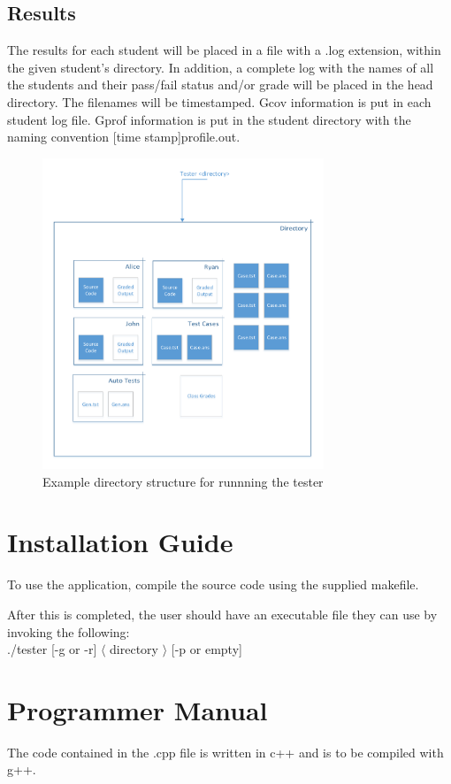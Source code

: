 \subsection{Results}
The results for each student will be placed in a file with a .log extension, within the given student's directory. 
In addition, a complete log with the names of all the students and their pass/fail status and/or grade will be placed 
in the head directory. The filenames will be timestamped. Gcov information is put in each student log file. Gprof information is put in the student directory with the naming convention [time stamp]profile.out.

\begin{figure}[H]
\begin{center}
\includegraphics[width=0.75\textwidth]{./Dir_struct}
\end{center}
\caption{Example directory structure for runnning the tester \label{dir}}
\end{figure}

\section{Installation Guide}
To use the application, compile the source code using the supplied makefile.

After this is completed, the user should have an
executable file they can use by invoking the following: \\
./tester [-g or -r] $\langle$ directory $\rangle$ [-p or empty]

\section{Programmer Manual}
The code contained in the .cpp file is written in c++ and is to be compiled with g++.
